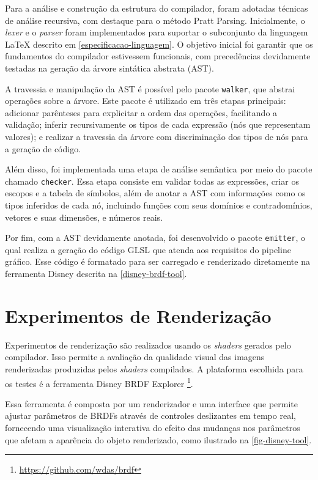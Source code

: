 Para a análise e construção da estrutura do compilador, foram adotadas técnicas de análise recursiva, com destaque para o método Pratt Parsing. Inicialmente, o \textit{lexer} e o \textit{parser} foram implementados para suportar o subconjunto da linguagem \LaTeX{} descrito em \autoref{especificacao-linguagem}. O objetivo inicial foi garantir que os fundamentos do compilador estivessem funcionais, com precedências devidamente testadas na geração da árvore sintática abstrata (AST).

A travessia e manipulação da AST é possível pelo pacote \texttt{walker}, que abstrai operações sobre a árvore. Este pacote é utilizado em três etapas principais: adicionar parênteses para explicitar a ordem das operações, facilitando a validação; inferir recursivamente os tipos de cada expressão (nós que representam valores); e realizar a travessia da árvore com discriminação dos tipos de nós para a geração de código.


Além disso, foi implementada uma etapa de análise semântica por meio do pacote chamado \texttt{checker}. Essa etapa consiste em validar todas as expressões, criar os escopos e a tabela de símbolos, além de anotar a AST com informações como os tipos inferidos de cada nó, incluindo funções com seus domínios e contradomínios, vetores e suas dimensões, e números reais.

Por fim, com a AST devidamente anotada, foi desenvolvido o pacote \texttt{emitter}, o qual realiza a geração do código GLSL que atenda aos requisitos do pipeline gráfico. Esse código é formatado para ser carregado e renderizado diretamente na ferramenta Disney descrita na \autoref{disney-brdf-tool}.

\section{Experimentos de Renderização} \label{experimentos-renderizacao}


Experimentos de renderização são realizados usando os \textit{shaders} gerados pelo compilador. Isso permite a avaliação da qualidade visual das imagens renderizadas produzidas pelos \textit{shaders} compilados. A plataforma escolhida para os testes é a ferramenta \label{disney-brdf-tool} Disney BRDF Explorer \footnote{\url{https://github.com/wdas/brdf}}.


Essa ferramenta é composta por um renderizador e uma interface que permite ajustar parâmetros de BRDFs através de controles deslizantes em tempo real, fornecendo uma visualização interativa do efeito das mudanças nos parâmetros que afetam a aparência do objeto renderizado, como ilustrado na \autoref{fig-disney-tool}.

